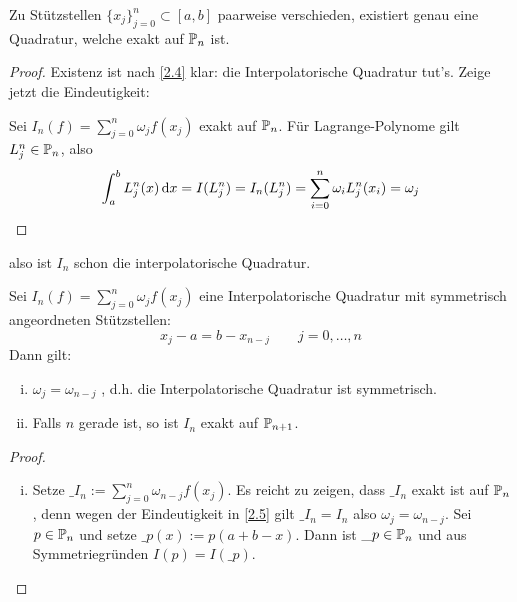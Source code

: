 \documentclass[
]{mycourse}
\begin{document}
\begin{st}
	\label{2.5}
	Zu Stützstellen $\{x_j\}_{j=0}^n \subset [a,b]$ paarweise verschieden, existiert genau eine Quadratur, welche exakt auf $\P_n$ ist.
	\begin{proof}
		Existenz ist nach \ref{2.4} klar: die Interpolatorische Quadratur tut's.
		Zeige jetzt die Eindeutigkeit:

		Sei $I_n(f) = \sum_{j=0}^n \omega_j f(x_j)$ exakt auf $\P_n$.
		Für Lagrange-Polynome gilt $L_j^n \in \P_n$, also
		\[
			\int_a^b L_j^n (x) \dx = I(L_j^n) = I_n(L_j^n) = \sum_{i=0}^n \omega_i L_j^n(x_i) = \omega_j
		\]
	\end{proof}
	also ist $I_n$ schon die interpolatorische Quadratur.
\end{st}

\begin{st}
	\label{2.6}
	Sei $I_n(f) = \sum_{j=0}^n \omega_j f(x_j)$ eine Interpolatorische Quadratur mit symmetrisch angeordneten Stützstellen:
	\[
		x_j - a = b - x_{n-j} \qquad j=0,\dotsc,n
	\]
	Dann gilt:
	\begin{enumerate}[i)]
		\item
			$\omega_j = \omega_{n-j}$ , d.h. die Interpolatorische Quadratur ist symmetrisch.
		\item
			Falls $n$ gerade ist, so ist $I_n$ exakt auf $\P_{n+1}$.
	\end{enumerate}
	\begin{proof}
		\begin{enumerate}[i)]
			\item
				Setze $\_{I_n} := \sum_{j=0}^n \omega_{n-j}f(x_j)$.
				Es reicht zu zeigen, dass $\_{I_n}$ exakt ist auf $\P_n$, denn wegen der Eindeutigkeit in \ref{2.5} gilt $\_{I_n}=I_n$ also $\omega_j=\omega_{n-j}$.
				Sei $p\in \P_n$ und setze $\_p(x) := p(a+b-x)$.
				Dann ist $\_p \in \P_n$ und aus Symmetriegründen $I(p) = I(\_p)$.


\end{enumerate}
\end{proof}
\end{st}
\end{document}
